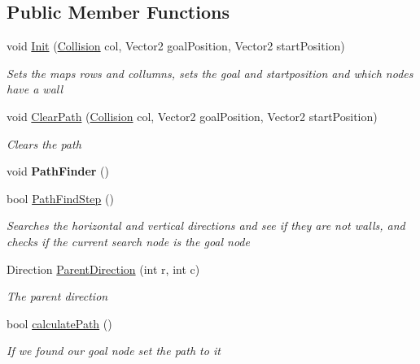 \subsection*{Public Member Functions}
\begin{DoxyCompactItemize}
\item 
void \hyperlink{class_pacman_1_1_path_finding_ab8d7e426f26863d649aba98fbb6ca3d9}{Init} (\hyperlink{class_pacman_1_1_collision}{Collision} col, Vector2 goal\-Position, Vector2 start\-Position)
\begin{DoxyCompactList}\small\item\em Sets the maps rows and collumns, sets the goal and startposition and which nodes have a wall \end{DoxyCompactList}\item 
void \hyperlink{class_pacman_1_1_path_finding_a9e27351b57793d85d58bb5f9743cd780}{Clear\-Path} (\hyperlink{class_pacman_1_1_collision}{Collision} col, Vector2 goal\-Position, Vector2 start\-Position)
\begin{DoxyCompactList}\small\item\em Clears the path \end{DoxyCompactList}\item 
\hypertarget{class_pacman_1_1_path_finding_ad971d9340e21fa692108e23a30b3cef7}{void {\bfseries Path\-Finder} ()}\label{class_pacman_1_1_path_finding_ad971d9340e21fa692108e23a30b3cef7}

\item 
bool \hyperlink{class_pacman_1_1_path_finding_aff5cef225414a175fc55139a5b908ef4}{Path\-Find\-Step} ()
\begin{DoxyCompactList}\small\item\em Searches the horizontal and vertical directions and see if they are not walls, and checks if the current search node is the goal node \end{DoxyCompactList}\item 
Direction \hyperlink{class_pacman_1_1_path_finding_a8ca9a4cf80b3b7cf7b345d193a540c3a}{Parent\-Direction} (int r, int c)
\begin{DoxyCompactList}\small\item\em The parent direction \end{DoxyCompactList}\item 
bool \hyperlink{class_pacman_1_1_path_finding_a1aa5a9d3a5ac6cf29a71999c67314e0e}{calculate\-Path} ()
\begin{DoxyCompactList}\small\item\em If we found our goal node set the path to it \end{DoxyCompactList}\end{DoxyCompactItemize}
